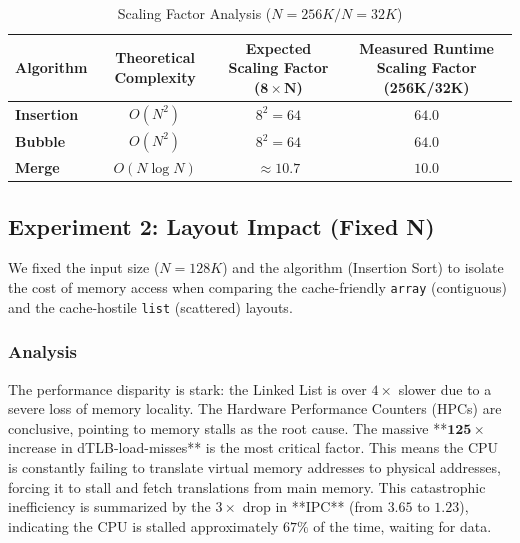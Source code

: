 \documentclass[11pt, a4paper]{article}
\begin{document}
\begin{table}[h]
\centering
\caption{Scaling Factor Analysis ($N=256K / N=32K$)}
\label{tab:scaling_factor}
\begin{tabularx}{\textwidth}{l C C C}
\toprule
\textbf{Algorithm} & \textbf{Theoretical Complexity} & \textbf{Expected Scaling Factor ($\mathbf{8 \times N}$)} & \textbf{Measured Runtime Scaling Factor (256K/32K)} \\
\midrule
\textbf{Insertion} & $O(N^2)$ & $8^2 = 64$ & $\mathbf{64.0}$ \\
\textbf{Bubble} & $O(N^2)$ & $8^2 = 64$ & $\mathbf{64.0}$ \\
\textbf{Merge} & $O(N \log N)$ & $\approx 10.7$ & $\mathbf{10.0}$ \\
\bottomrule
\end{tabularx}
\end{table}


\subsection{Experiment 2: Layout Impact (Fixed N)}
We fixed the input size ($N=128K$) and the algorithm (Insertion Sort) to isolate the cost of memory access when comparing the cache-friendly \texttt{array} (contiguous) and the cache-hostile \texttt{list} (scattered) layouts.

\subsubsection{Analysis}
The performance disparity is stark: the Linked List is over $4\times$ slower due to a severe loss of memory locality. The Hardware Performance Counters (HPCs) are conclusive, pointing to memory stalls as the root cause. The massive **$\mathbf{125\times}$ increase in dTLB-load-misses** is the most critical factor. This means the CPU is constantly failing to translate virtual memory addresses to physical addresses, forcing it to stall and fetch translations from main memory. This catastrophic inefficiency is summarized by the $3\times$ drop in **IPC** (from $3.65$ to $1.23$), indicating the CPU is stalled approximately $67\%$ of the time, waiting for data.
\end{document}
